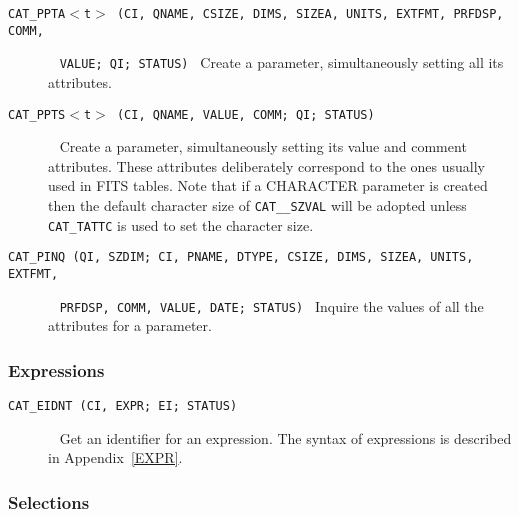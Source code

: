 \documentclass[11pt,twoside]{starlink}
\begin{document}
\begin{description}

  \item[ \texttt{CAT\_PPTA$<$t$>$ (CI, QNAME, CSIZE, DIMS, SIZEA, UNITS,
   EXTFMT, PRFDSP, COMM, } ] ~
  \newline \texttt{VALUE; QI; STATUS) }
  \newline Create a parameter, simultaneously setting all its
   attributes.

  \item[ \texttt{CAT\_PPTS$<$t$>$ (CI, QNAME, VALUE, COMM; QI; STATUS)
   } ] ~
  \newline Create a parameter, simultaneously setting its value and
   comment attributes. These attributes deliberately correspond to the
   ones usually used in FITS tables. Note that if a CHARACTER
   parameter is created then the default character size of \texttt{CAT\_\_SZVAL} will be adopted unless \texttt{CAT\_TATTC} is used to set
   the character size.

  \item[ \texttt{CAT\_PINQ (QI, SZDIM; CI, PNAME, DTYPE, CSIZE, DIMS,
   SIZEA, UNITS, EXTFMT, } ] ~
  \newline \texttt{PRFDSP, COMM, VALUE, DATE; STATUS) }
  \newline Inquire the values of all the attributes for a parameter.

\end{description}

\subsubsection{Expressions}

\begin{description}

  \item[ \texttt{CAT\_EIDNT (CI, EXPR; EI; STATUS) } ] ~
  \newline Get an identifier for an expression. The syntax of
   expressions is described in Appendix~\ref{EXPR}.

\end{description}

\subsubsection{Selections}
\end{document}
